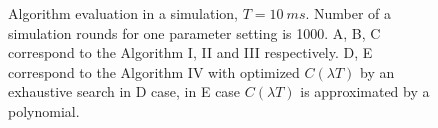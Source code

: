 \documentclass[twoside]{article}
\begin{document}
\begin{multicols}{2}
\begin{figure}[H]
{}
\caption{Algorithm evaluation in a simulation, $T=10~ms$. Number of a simulation rounds for one parameter setting is 1000.
 A, B, C correspond to the Algorithm I, II and III respectively.
 D, E correspond to the Algorithm IV with optimized $C(\lambda T)$ by an exhaustive search in D case, 
 in E case $C(\lambda T)$ is approximated by a polynomial.}
\label{fig:alg_eval}
\end{figure}
    

\end{multicols}
\end{document}
